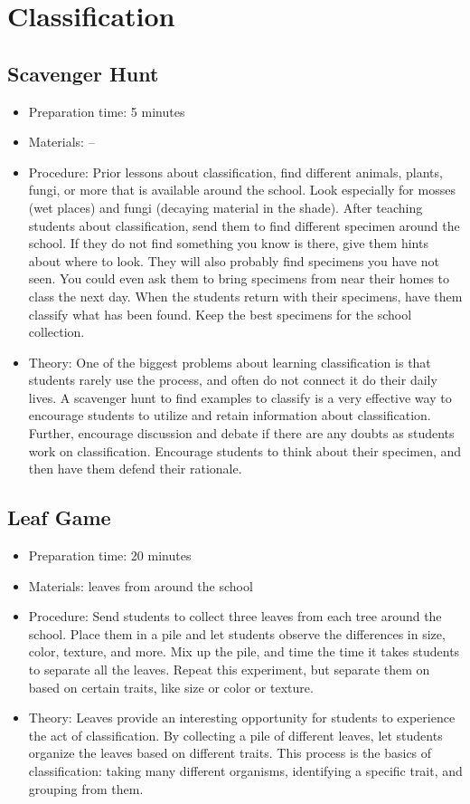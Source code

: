 \section{Classification}

\subsection{Scavenger Hunt}
\begin{itemize}
\item{Preparation time: 5 minutes}
\item{Materials: --}
\item{Procedure: Prior lessons about classification, find different animals, plants, fungi, or more that is available around the school. Look especially for mosses (wet places) and fungi (decaying material in the shade). After teaching students about classification, send them to find different specimen around the school. If they do not find something you know is there, give them hints about where to look. They will also probably find specimens you have not seen. You could even ask them to bring specimens from near their homes to class the next day. When the students return with their specimens, have them classify what has been found. Keep the best specimens for the school collection.}
\item{Theory: One of the biggest problems about learning classification is that students rarely use the process, and often do not connect it do their daily lives. A scavenger hunt to find examples to classify is a very effective way to encourage students to utilize and retain information about classification. Further, encourage discussion and debate if there are any doubts as students work on classification. Encourage students to think about their specimen, and then have them defend their rationale.}
\end{itemize}


\subsection{Leaf Game}
\begin{itemize}
\item{Preparation time: 20 minutes}
\item{Materials: leaves from around the school}
\item{Procedure: Send students to collect three leaves from each tree around the school. Place them in a pile and let students observe the differences in size, color, texture, and more. Mix up the pile, and time the time it takes students to separate all the leaves. Repeat this experiment, but separate them on based on certain traits, like size or color or texture.}
\item{Theory: Leaves provide an interesting opportunity for students to experience the act of classification. By collecting a pile of different leaves, let students organize the leaves based on different traits. This process is the basics of classification: taking many different organisms, identifying a specific trait, and grouping from them.}
\end{itemize}


